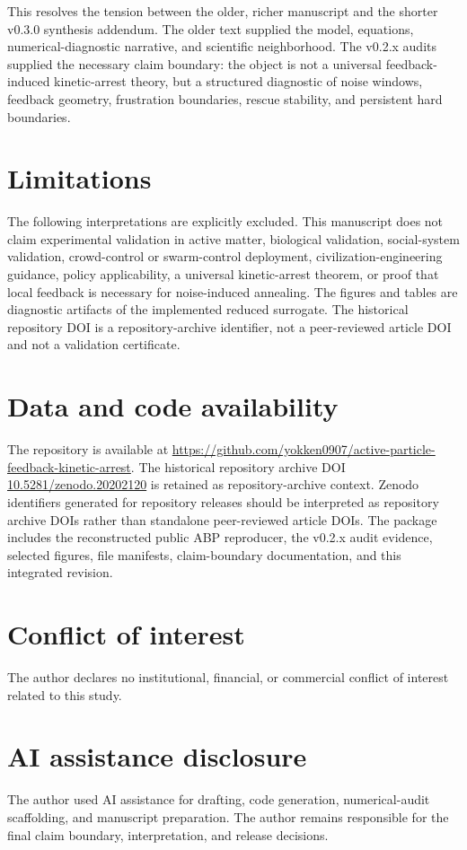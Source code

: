 \documentclass[11pt]{article}
\begin{document}
This resolves the tension between the older, richer manuscript and the shorter v0.3.0 synthesis addendum. The older text supplied the model, equations, numerical-diagnostic narrative, and scientific neighborhood. The v0.2.x audits supplied the necessary claim boundary: the object is not a universal feedback-induced kinetic-arrest theory, but a structured diagnostic of noise windows, feedback geometry, frustration boundaries, rescue stability, and persistent hard boundaries.

\section{Limitations}
The following interpretations are explicitly excluded. This manuscript does not claim experimental validation in active matter, biological validation, social-system validation, crowd-control or swarm-control deployment, civilization-engineering guidance, policy applicability, a universal kinetic-arrest theorem, or proof that local feedback is necessary for noise-induced annealing. The figures and tables are diagnostic artifacts of the implemented reduced surrogate. The historical repository DOI is a repository-archive identifier, not a peer-reviewed article DOI and not a validation certificate.

\section*{Data and code availability}
The repository is available at \url{https://github.com/yokken0907/active-particle-feedback-kinetic-arrest}. The historical repository archive DOI \href{https://doi.org/10.5281/zenodo.20202120}{10.5281/zenodo.20202120} is retained as repository-archive context. Zenodo identifiers generated for repository releases should be interpreted as repository archive DOIs rather than standalone peer-reviewed article DOIs. The package includes the reconstructed public ABP reproducer, the v0.2.x audit evidence, selected figures, file manifests, claim-boundary documentation, and this integrated revision.

\section*{Conflict of interest}
The author declares no institutional, financial, or commercial conflict of interest related to this study.

\section*{AI assistance disclosure}
The author used AI assistance for drafting, code generation, numerical-audit scaffolding, and manuscript preparation. The author remains responsible for the final claim boundary, interpretation, and release decisions.
\end{document}
